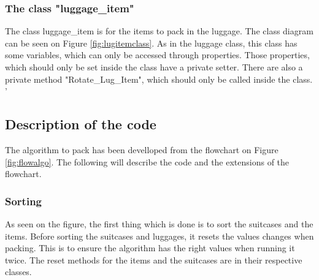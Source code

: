\subsubsection{The class "luggage\_item"}
The class luggage\_item is for the items to pack in the luggage. The class diagram can be seen on Figure \ref{fig:lugitemclass}. As in the luggage class, this class has some variables, which can only be accessed through properties. Those properties, which should only be set inside the class have a private setter. There are also a private method "Rotate\_Lug\_Item", which should only be called inside the class.
'

\subsection{Description of the code}
The algorithm to pack has been develloped from the flowchart on Figure \ref{fig:flowalgo}. The following will describe the code and the extensions of the flowchart.
\subsubsection{Sorting}
As seen on the figure, the first thing which is done is to sort the suitcases and the items. Before sorting the suitcases and luggages, it resets the values changes when packing. This is to ensure the algorithm has the right values when running it twice. The reset methods for the items and the suitcases are in their respective classes. 